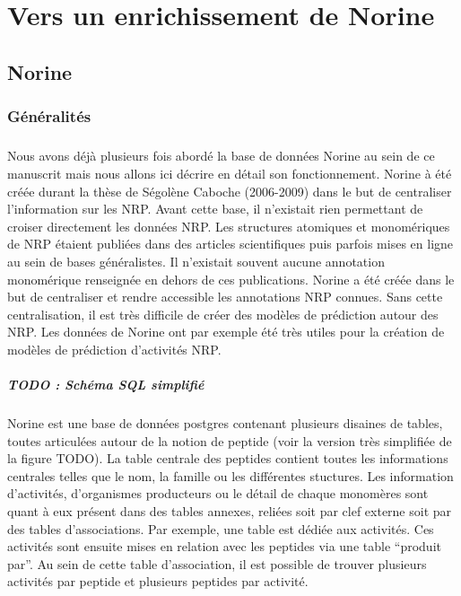 \documentclass[12pt,french,twoside]{report}
\begin{document}
\chapter{Vers un enrichissement de Norine}

\section{Norine}

\subsection{Généralités}

\paragraph{}Nous avons déjà plusieurs fois abordé la base de données Norine au sein de ce manuscrit mais nous allons ici décrire en détail son fonctionnement.
Norine à été créée durant la thèse de Ségolène Caboche (2006-2009) dans le but de centraliser l'information sur les NRP.
Avant cette base, il n'existait rien permettant de croiser directement les données NRP.
Les structures atomiques et monomériques de NRP étaient publiées dans des articles scientifiques puis parfois mises en ligne au sein de bases généralistes.
Il n'existait souvent aucune annotation monomérique renseignée en dehors de ces publications.
Norine a été créée dans le but de centraliser et rendre accessible les annotations NRP connues.
Sans cette centralisation, il est très difficile de créer des modèles de prédiction autour des NRP.
Les données de Norine ont par exemple été très utiles pour la création de modèles de prédiction d'activités NRP.

\paragraph{TODO : Schéma SQL simplifié}

\paragraph{}Norine est une base de données postgres contenant plusieurs disaines de tables, toutes articulées autour de la notion de peptide (voir la version très simplifiée de la figure TODO).
La table centrale des peptides contient toutes les informations centrales telles que le nom, la famille ou les différentes stuctures.
Les information d'activités, d'organismes producteurs ou le détail de chaque monomères sont quant à eux présent dans des tables annexes, reliées soit par clef externe soit par des tables d'associations.
Par exemple, une table est dédiée aux activités.
Ces activités sont ensuite mises en relation avec les peptides via une table ``produit par''.
Au sein de cette table d'association, il est possible de trouver plusieurs activités par peptide et plusieurs peptides par activité.
\end{document}
